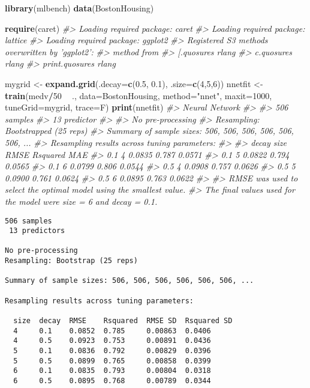 \documentclass[]{book}
\newenvironment{Shaded}{\begin{snugshade}}{\end{snugshade}}
\newcommand{\CommentTok}[1]{\textcolor[rgb]{0.56,0.35,0.01}{\textit{#1}}}
\newcommand{\DataTypeTok}[1]{\textcolor[rgb]{0.13,0.29,0.53}{#1}}
\newcommand{\DecValTok}[1]{\textcolor[rgb]{0.00,0.00,0.81}{#1}}
\newcommand{\FloatTok}[1]{\textcolor[rgb]{0.00,0.00,0.81}{#1}}
\newcommand{\KeywordTok}[1]{\textcolor[rgb]{0.13,0.29,0.53}{\textbf{#1}}}
\newcommand{\NormalTok}[1]{#1}
\newcommand{\OperatorTok}[1]{\textcolor[rgb]{0.81,0.36,0.00}{\textbf{#1}}}
\newcommand{\StringTok}[1]{\textcolor[rgb]{0.31,0.60,0.02}{#1}}
\begin{document}
\begin{Shaded}
\begin{Highlighting}[]
 \KeywordTok{library}\NormalTok{(mlbench)}
 \KeywordTok{data}\NormalTok{(BostonHousing)}
 
\KeywordTok{require}\NormalTok{(caret)}
\CommentTok{#> Loading required package: caret}
\CommentTok{#> Loading required package: lattice}
\CommentTok{#> Loading required package: ggplot2}
\CommentTok{#> Registered S3 methods overwritten by 'ggplot2':}
\CommentTok{#>   method         from }
\CommentTok{#>   [.quosures     rlang}
\CommentTok{#>   c.quosures     rlang}
\CommentTok{#>   print.quosures rlang}
 
\NormalTok{mygrid <-}\StringTok{ }\KeywordTok{expand.grid}\NormalTok{(}\DataTypeTok{.decay=}\KeywordTok{c}\NormalTok{(}\FloatTok{0.5}\NormalTok{, }\FloatTok{0.1}\NormalTok{), }\DataTypeTok{.size=}\KeywordTok{c}\NormalTok{(}\DecValTok{4}\NormalTok{,}\DecValTok{5}\NormalTok{,}\DecValTok{6}\NormalTok{))}
\NormalTok{nnetfit <-}\StringTok{ }\KeywordTok{train}\NormalTok{(medv}\OperatorTok{/}\DecValTok{50} \OperatorTok{~}\StringTok{ }\NormalTok{., }\DataTypeTok{data=}\NormalTok{BostonHousing, }\DataTypeTok{method=}\StringTok{"nnet"}\NormalTok{, }\DataTypeTok{maxit=}\DecValTok{1000}\NormalTok{, }\DataTypeTok{tuneGrid=}\NormalTok{mygrid, }\DataTypeTok{trace=}\NormalTok{F) }
\KeywordTok{print}\NormalTok{(nnetfit)}
\CommentTok{#> Neural Network }
\CommentTok{#> }
\CommentTok{#> 506 samples}
\CommentTok{#>  13 predictor}
\CommentTok{#> }
\CommentTok{#> No pre-processing}
\CommentTok{#> Resampling: Bootstrapped (25 reps) }
\CommentTok{#> Summary of sample sizes: 506, 506, 506, 506, 506, 506, ... }
\CommentTok{#> Resampling results across tuning parameters:}
\CommentTok{#> }
\CommentTok{#>   decay  size  RMSE    Rsquared  MAE   }
\CommentTok{#>   0.1    4     0.0835  0.787     0.0571}
\CommentTok{#>   0.1    5     0.0822  0.794     0.0565}
\CommentTok{#>   0.1    6     0.0799  0.806     0.0544}
\CommentTok{#>   0.5    4     0.0908  0.757     0.0626}
\CommentTok{#>   0.5    5     0.0900  0.761     0.0624}
\CommentTok{#>   0.5    6     0.0895  0.763     0.0622}
\CommentTok{#> }
\CommentTok{#> RMSE was used to select the optimal model using the smallest value.}
\CommentTok{#> The final values used for the model were size = 6 and decay = 0.1.}
\end{Highlighting}
\end{Shaded}

\begin{verbatim}
506 samples
 13 predictors
 
No pre-processing
Resampling: Bootstrap (25 reps) 
 
Summary of sample sizes: 506, 506, 506, 506, 506, 506, ... 
 
Resampling results across tuning parameters:
 
  size  decay  RMSE    Rsquared  RMSE SD  Rsquared SD
  4     0.1    0.0852  0.785     0.00863  0.0406     
  4     0.5    0.0923  0.753     0.00891  0.0436     
  5     0.1    0.0836  0.792     0.00829  0.0396     
  5     0.5    0.0899  0.765     0.00858  0.0399     
  6     0.1    0.0835  0.793     0.00804  0.0318     
  6     0.5    0.0895  0.768     0.00789  0.0344   
\end{verbatim}
\end{document}

